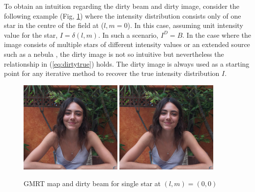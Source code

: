 To obtain an intuition regarding the dirty beam and dirty image, consider the following example (Fig, \ref{fig:mapndirty}) where the intensity distribution consists only of one star in the centre of the field at ($l, m = 0$).
In this case, assuming unit intensity value for the star, 
${I} = \delta (l,m)$. In such a scenario, $I^D = B$. 
In the case where the image consists of multiple stars of different intensity values or an extended source such as a nebula , the dirty image is not so intuitive but nevertheless the relationship in (\ref{eq:dirtytrue}) holds. The dirty image is always used as a starting point for any iterative method to recover the true intensity distribution $I$. \\

\begin{figure}[htp]
	\centering \vspace{-0.1in}
	\includegraphics[width=0.45\textwidth]{images/map_image.png}	\hfill
	\includegraphics[width=0.45\textwidth]{images/dirty_beam.png}	
	 \caption[GMRT map the dirty beam]{\small GMRT map and dirty beam for single star at $(l, m) = (0,0)$}
	\label{fig:mapndirty}
\end{figure}
